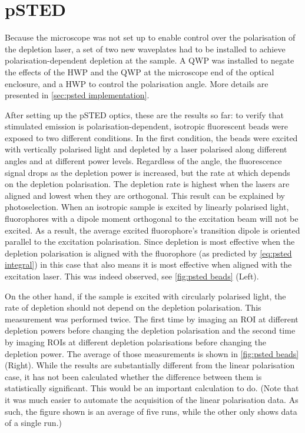 \section{pSTED}

Because the microscope was not set up to enable control over the polarisation of the depletion laser, a set of two new waveplates had to be installed to achieve polarisation-dependent depletion at the sample. A QWP was installed to negate the effects of the HWP and the QWP at the microscope end of the optical enclosure, and a HWP to control the polarisation angle. More details are presented in \autoref{sec:psted implementation}.

After setting up the pSTED optics, these are the results so far: to verify that stimulated emission is polarisation-dependent, isotropic fluorescent beads were exposed to two different conditions. In the first condition, the beads were excited with vertically polarised light and depleted by a laser polarised along different angles and at different power levels. Regardless of the angle, the fluorescence signal drops as the depletion power is increased, but the rate at which depends on the depletion polarisation. The depletion rate is highest when the lasers are aligned and lowest when they are orthogonal. This result can be explained by photoselection. When an isotropic sample is excited by linearly polarised light, fluorophores with a dipole moment orthogonal to the excitation beam will not be excited. As a result, the average excited fluorophore's transition dipole is oriented parallel to the excitation polarisation. Since depletion is most effective when the depletion polarisation is aligned with the fluorophore (as predicted by \autoref{eq:psted integral}) in this case that also means it is most effective when aligned with the excitation laser. This was indeed observed, see \autoref{fig:psted beads} (Left). 

On the other hand, if the sample is excited with circularly polarised light, the rate of depletion should not depend on the depletion polarisation. This measurement was performed twice. The first time by imaging an ROI at different depletion powers before changing the depletion polarisation and the second time by imaging ROIs at different depletion polarisations before changing the depletion power. The average of those measurements is shown in \autoref{fig:psted beads} (Right). While the results are substantially different from the linear polarisation case, it has not been calculated whether the difference between them is statistically significant. This would be an important calculation to do. (Note that it was much easier to automate the acquisition of the linear polarisation data. As such, the figure shown is an average of five runs, while the other only shows data of a single run.)

